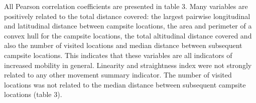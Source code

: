 \documentclass[]{elsarticle} %
\begin{document}
All Pearson correlation coefficients are presented in table 3. Many
variables are positively related to the total distance covered: the
largest pairwise longitudinal and latitudinal distance between campsite
locations, the area and perimeter of a convex hull for the campsite
locations, the total altitudinal distance covered and also the number of
visited locations and median distance between subsequent campsite
locations. This indicates that these variables are all indicators of
increased mobility in general. Linearity and straightness index were not
strongly related to any other movement summary indicator. The number of
visited locations was not related to the median distance between
subsequent campsite locations (table 3).

\begin{landscape}\begingroup\fontsize{8}{10}\selectfont


\end{landscape}
\end{document}
